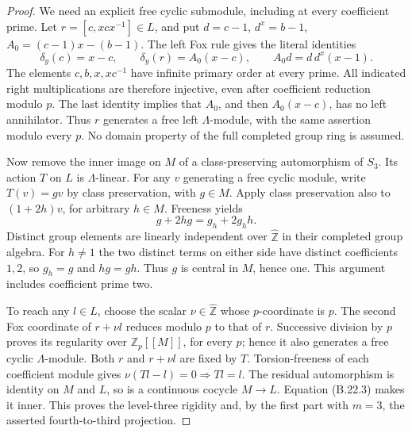 \begin{proof}
We need an explicit free cyclic submodule, including at every
coefficient prime. Let $r=[c,xcx^{-1}]\in L$, and put
$d=c-1$, $d^x=b-1$, $A_0=(c-1)x-(b-1)$.
The left Fox rule gives the literal identities
\[
 \delta_y(c)=x-c,\qquad
 \delta_y(r)=A_0(x-c),\qquad
                A_0d=d\,d^x(x-1).
 \tag{B.22.4}
\]
The elements $c,b,x,xc^{-1}$ have infinite primary order at
every prime. All indicated right multiplications are therefore
injective, even after coefficient reduction modulo $p$.
The last identity implies that $A_0$, and then $A_0(x-c)$,
has no left annihilator. Thus $r$ generates a free left
$\Lambda$-module, with the same assertion modulo every $p$.
No domain property of the full completed group ring is assumed.

Now remove the inner image on $M$ of a class-preserving
automorphism of $S_3$. Its action $T$ on $L$ is $\Lambda$-linear.
For any $v$ generating a free cyclic module, write $T(v)=gv$
by class preservation, with $g\in M$. Apply class preservation
also to $(1+2h)v$, for arbitrary $h\in M$. Freeness yields
\[
                  g+2hg=g_h+2g_hh.
\]
Distinct group elements are linearly independent over
$\widehat{\mathbb Z}$ in their completed group algebra.
For $h\ne1$ the two distinct terms on either side have distinct
coefficients $1,2$, so $g_h=g$ and $hg=gh$. Thus $g$ is central
in $M$, hence one. This argument includes coefficient prime two.

To reach any $l\in L$, choose the scalar
$\nu\in\widehat{\mathbb Z}$ whose $p$-coordinate is $p$.
The second Fox coordinate of $r+\nu l$ reduces modulo $p$ to
that of $r$. Successive division by $p$ proves its regularity
over $\mathbb Z_p[[M]]$, for every $p$; hence it also generates
a free cyclic $\Lambda$-module. Both $r$ and $r+\nu l$ are
fixed by $T$. Torsion-freeness of each coefficient module gives
$\nu(Tl-l)=0\Rightarrow Tl=l$.
The residual automorphism is identity on $M$ and $L$, so is a
continuous cocycle $M\to L$. Equation (B.22.3) makes it inner.
This proves the level-three rigidity and, by the first part with
$m=3$, the asserted fourth-to-third projection.
\end{proof}

